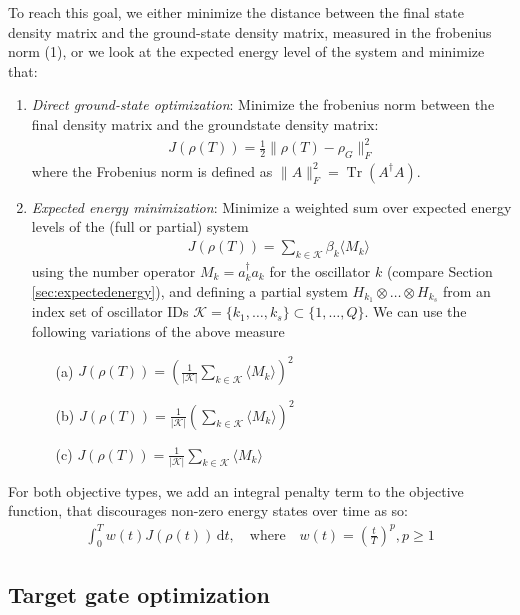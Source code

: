 \documentclass[letterpaper]{article}
\DeclareMathOperator{\Tr}{Tr}
\begin{document}
To reach this goal, we either minimize the distance between the final state density matrix and the ground-state density matrix, measured in the frobenius norm (1), or we look at the expected energy level of the system and minimize that:
\begin{enumerate}
  \item \textit{Direct ground-state optimization}: Minimize the frobenius norm between the final density matrix and the groundstate density matrix:
    \begin{align}
      J(\rho(T)) = \frac 12 \| \rho(T) - \rho_G \|^2_F 
    \end{align}
    where the Frobenius norm is defined as $\|A\|^2_F = \Tr(A^{\dagger}A)$.
  \item \textit{Expected energy minimization}: Minimize a weighted sum over expected energy levels of the (full or partial) system
    \begin{align}
       \quad J(\rho(T)) = \sum_{k\in \mathcal{K}} \beta_k \langle M_k \rangle 
    \end{align}
    using the number operator $M_k = a_k^\dag a_k$ for the oscillator $k$ (compare Section \ref{sec:expectedenergy}), and defining a partial system $H_{k_1}\otimes \dots \otimes H_{k_s}$ from an index set of oscillator IDs $\mathcal{K}=\{k_1,\dots,k_s\}\subset \{1,\dots,Q\}$. We can use the following variations of the above measure
    \begin{enumerate}
      \item[(a)] $J(\rho(T)) = \left(\frac{1}{|\mathcal{K}|}\sum_{k\in\mathcal{K}}\langle M_k \rangle \right)^2$
      \item[(b)] $J(\rho(T)) = \frac{1}{|\mathcal{K}|}\left(\sum_{k\in\mathcal{K}}\langle M_k \rangle \right)^2 $
      \item[(c)] $J(\rho(T)) = \frac{1}{|\mathcal{K}|}\sum_{k\in\mathcal{K}}\langle M_k \rangle$
    \end{enumerate}

\end{enumerate}

For both objective types, we add an integral penalty term to the objective function, that discourages non-zero energy states over time as so:
\begin{align}
  \int_0^T w(t) J(\rho(t)) \, \mathrm{d}t, \quad \text{where} \quad w(t) = \left(\frac{t}{T}\right)^p, p \geq 1
\end{align}


\subsection{Target gate optimization}
\end{document}
